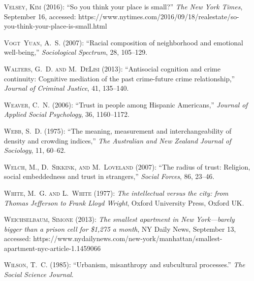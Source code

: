 \documentclass[11pt, letterpaper]{article}
\begin{document}
\begin{spacing}{1.4}
\begin{thebibliography}{92}
\textsc{Velsey, Kim} (2016): \enquote{So you think your place is small?} \emph{The New York Times}, September 16, accessed: https://www.nytimes.com/2016/09/18/realestate/so-you-think-your-place-is-small.html 

\textsc{Vogt~Yuan, A.~S.} (2007): \enquote{Racial composition of neighborhood
  and emotional well-being,} \emph{Sociological Spectrum}, 28, 105--129.

\textsc{Walters, G.~D. and M.~DeLisi} (2013): \enquote{Antisocial cognition and
  crime continuity: Cognitive mediation of the past crime-future crime
  relationship,} \emph{Journal of Criminal Justice}, 41, 135--140.

\textsc{Weaver, C.~N.} (2006): \enquote{Trust in people among Hispanic
  Americans,} \emph{Journal of Applied Social Psychology}, 36, 1160--1172.

\textsc{Webb, S.~D.} (1975): \enquote{The meaning, measurement and
  interchangeability of density and crowding indices,} \emph{The Australian and
  New Zealand Journal of Sociology}, 11, 60--62.

\textsc{Welch, M., D.~Sikkink, and M.~Loveland} (2007): \enquote{The radius of
  trust: Religion, social embeddedness and trust in strangers,} \emph{Social
  Forces}, 86, 23--46.

\textsc{White, M.~G. and L.~White} (1977): \emph{The intellectual versus the
  city: from Thomas Jefferson to Frank Lloyd Wright}, Oxford University Press,
  Oxford UK.
  
\textsc{Weichselbaum, Simone} (2013): \emph{The smallest apartment in New York---barely bigger than a prison cell for \$1,275 a month}, NY Daily News, September 13, accessed: https://www.nydailynews.com/new-york/manhattan/smallest-apartment-nyc-article-1.1459066

\textsc{Wilson, T.~C.} (1985): \enquote{Urbanism, misanthropy and subcultural
  processes.} \emph{The Social Science Journal}.


\end{thebibliography}
\end{spacing}
\end{document}
